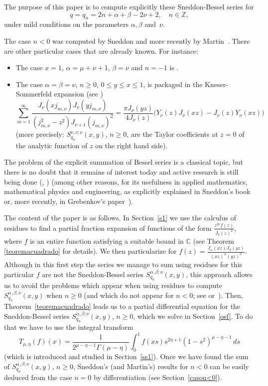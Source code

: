 \documentclass[10pt,leqno,a4paper]{article}
\theoremstyle{plain}
\newcommand{\ZZ}{\mathbb{Z}}
\newcommand{\CC}{\mathbb{C}}
\numberwithin{equation}{section}
\begin{document}
The purpose of this paper is to compute explicitly these Sneddon-Bessel series for
\[
   q = q_n = 2n+\alpha+\beta-2\nu+2,\quad n\in \ZZ,
\]
under mild conditions on the parameters $\alpha,\beta$ and~$\nu$.

The case $n<0$ was computed by Sneddon \cite[\S\,2.2]{Sne} and more recently by Martin~\cite{Mar}. There are other particular cases that are
already known. For instance:
\begin{itemize}
\item[(a)] The case $x=1$, $\alpha=\mu+\nu+1$, $\beta=\nu$ and $n=-1$ is \cite[p.~690, (9)]{PBM}.
\item[(b)] The case $\alpha=\beta=\nu$, $n\geq 0$, $0\leq y\leq x\leq 1$, is packaged in the Kneser-Sommerfeld expansion (see \cite[(2)]{Mar})
\begin{equation}
\label{ks}
   \sum_{m=1}^\infty
   \frac{J_\nu(x j_{m,\nu})J_\nu(y j_{m,\nu})}{(j_{m,\nu}^{2}-z^2) J_{\nu+1}(j_{m,\nu})^2}
   = \frac{\pi J_\nu(yz)}{4J_\nu(z)}
   \big(Y_\nu(z)J_\nu(xz)-J_\nu(z)Y_\nu(xz)\big)
\end{equation}
(more precisely: $S_{q_n}^{\nu,\nu;\nu}(x,y)$, $n\geq 0$, are the Taylor coefficients at $z=0$ of the analytic function of $z$ on the right hand side).
\end{itemize}

The problem of the explicit summation of Bessel series is a classical topic, but there is no doubt that it remains of interest today and active research is still being done (\cite[\S\,6.8]{Br}, \cite{Gre})
(among other reasons, for its usefulness in applied mathematics, mathematical physics and engineering, as explicitly explained in Sneddon's book \cite{Sne} or, more recently, in Grebenkov's paper~\cite{Gre}).

The content of the paper is as follows. In Section~\ref{s1} we use the calculus of residues to find a partial fraction expansion of functions of the form $\frac{z^{2\nu}f(z)}{J_\nu(z)^2}$, where $f$ is an entire function satisfying a suitable bound in $\CC$ (see Theorem \ref{teoremacuadrado} for details). We then particularize for $f(z)=\frac{J_\alpha(xz)J_\beta(yz)}{(xz)^{\alpha}(yz)^{\beta}}$. Although in this first step the series we manage to sum using residues for this particular $f$ are not the Sneddon-Bessel series $S_{q_n}^{\alpha,\beta;\nu}(x,y)$, this approach allows us to avoid the problems which appear when using residues to compute $S_{q_n}^{\alpha,\beta;\nu}(x,y)$ when $n\ge 0$ (and which do not appear for $n<0$; see \cite[\S\,2.2]{Sne} or~\cite{Mar}). 
Then, Theorem~\ref{teoremacuadrado} leads us to a partial differential equation for the Sneddon-Bessel series $S_{q_n}^{\alpha,\beta;\nu}(x,y)$, $n\geq 0$, which we solve in Section~\ref{osf}. To do that we have to use the integral transform
\[
   T_{\mu,\eta}(f)(x) = \frac{1}{2^{\mu-\eta-1}\Gamma(\mu-\eta)}
   \int_0^1 f(xs) s^{2\eta+1} (1-s^2)^{\mu-\eta-1} \, ds
\]
(which is introduced and studied in Section~\ref{ss1}). Once we have found the sum of $S_{q_n}^{\alpha,\beta;\nu}(x,y)$, $n\geq 0$, Sneddon's (and Martin's) results for $n<0$
can be easily deduced from the case $n=0$ by differentiation (see Section~\ref{cason<0}).
\end{document}
